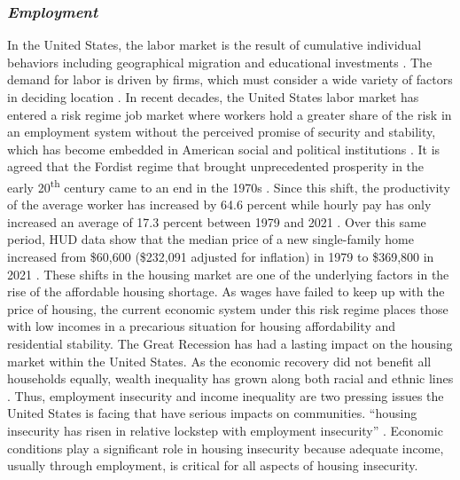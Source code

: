\subsubsection{\textit{Employment}}

In the United States, the labor market is the result of cumulative individual behaviors including geographical migration and educational investments \citep{wiener_labor_2020}. The demand for labor is driven by firms, which must consider a wide variety of factors in deciding location \citep{partridge_persistent_2007}. In recent decades, the United States labor market has entered a risk regime job market where workers hold a greater share of the risk in an employment system without the perceived promise of security and stability, which has become embedded in American social and political institutions \citep{lowe_perceived_2018}. It is agreed that the Fordist regime that brought unprecedented prosperity in the early 20\textsuperscript{th} century came to an end in the 1970s \citep{stockhammer_stylized_2008}. Since this shift, the productivity of the average worker has increased by 64.6 percent while hourly pay has only increased an average of 17.3 percent between 1979 and 2021 \citep{productivity-pay-gap_2022}. Over this same period, HUD data show that the median price of a new single-family home increased from \$60,600 (\$232,091 adjusted for inflation) in 1979 to \$369,800 in 2021 \citep{us_census_bureau_median_1963}. These shifts in the housing market are one of the underlying factors in the rise of the affordable housing shortage. As wages have failed to keep up with the price of housing, the current economic system under this risk regime places those with low incomes in a precarious situation for housing affordability and residential stability. The Great Recession has had a lasting impact on the housing market within the United States. As the economic recovery did not benefit all households equally, wealth inequality has grown along both racial and ethnic lines \citep{kochhar_wealth_2014}. Thus, employment insecurity and income inequality are two pressing issues the United States is facing that have serious impacts on communities. “housing insecurity has risen in relative lockstep with employment insecurity” \citep[48]{desmond_housing_2016-1}. Economic conditions play a significant role in housing insecurity because adequate income, usually through employment, is critical for all aspects of housing insecurity. 


